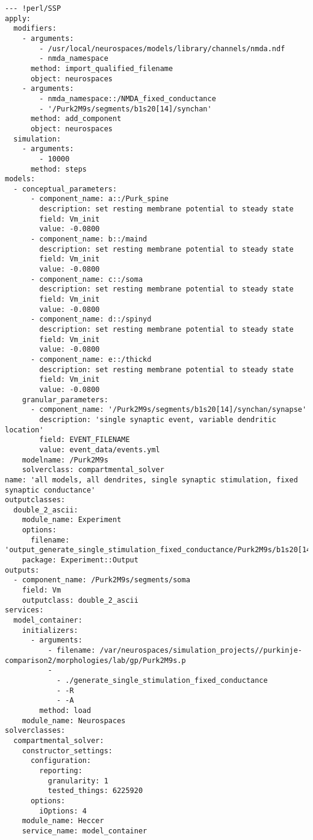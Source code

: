 \documentclass[12pt]{article}
\begin{document}
\begin{verbatim}
--- !perl/SSP
apply:
  modifiers:
    - arguments:
        - /usr/local/neurospaces/models/library/channels/nmda.ndf
        - nmda_namespace
      method: import_qualified_filename
      object: neurospaces
    - arguments:
        - nmda_namespace::/NMDA_fixed_conductance
        - '/Purk2M9s/segments/b1s20[14]/synchan'
      method: add_component
      object: neurospaces
  simulation:
    - arguments:
        - 10000
      method: steps
models:
  - conceptual_parameters:
      - component_name: a::/Purk_spine
        description: set resting membrane potential to steady state
        field: Vm_init
        value: -0.0800
      - component_name: b::/maind
        description: set resting membrane potential to steady state
        field: Vm_init
        value: -0.0800
      - component_name: c::/soma
        description: set resting membrane potential to steady state
        field: Vm_init
        value: -0.0800
      - component_name: d::/spinyd
        description: set resting membrane potential to steady state
        field: Vm_init
        value: -0.0800
      - component_name: e::/thickd
        description: set resting membrane potential to steady state
        field: Vm_init
        value: -0.0800
    granular_parameters:
      - component_name: '/Purk2M9s/segments/b1s20[14]/synchan/synapse'
        description: 'single synaptic event, variable dendritic location'
        field: EVENT_FILENAME
        value: event_data/events.yml
    modelname: /Purk2M9s
    solverclass: compartmental_solver
name: 'all models, all dendrites, single synaptic stimulation, fixed synaptic conductance'
outputclasses:
  double_2_ascii:
    module_name: Experiment
    options:
      filename: 'output_generate_single_stimulation_fixed_conductance/Purk2M9s/b1s20[14].output'
    package: Experiment::Output
outputs:
  - component_name: /Purk2M9s/segments/soma
    field: Vm
    outputclass: double_2_ascii
services:
  model_container:
    initializers:
      - arguments:
          - filename: /var/neurospaces/simulation_projects//purkinje-comparison2/morphologies/lab/gp/Purk2M9s.p
          -
            - ./generate_single_stimulation_fixed_conductance
            - -R
            - -A
        method: load
    module_name: Neurospaces
solverclasses:
  compartmental_solver:
    constructor_settings:
      configuration:
        reporting:
          granularity: 1
          tested_things: 6225920
      options:
        iOptions: 4
    module_name: Heccer
    service_name: model_container
\end{verbatim}
\end{document}
